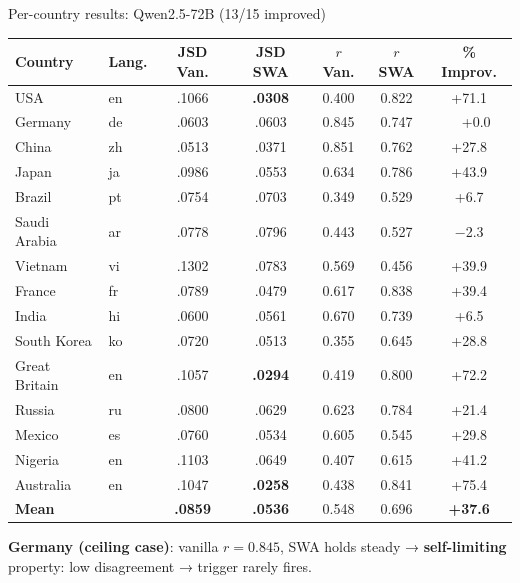 \documentclass[10pt,aspectratio=169]{beamer}
\newcommand{\gain}[1]{\textcolor{gaingreen}{#1}}
\newcommand{\loss}[1]{\textcolor{lossred}{#1}}
\begin{document}
\begin{frame}{Per-country results: Qwen2.5-72B (13/15 improved)}
  \centering\scriptsize
  \begin{tabular}{llccccc}
    \toprule
    Country & Lang. & JSD Van. & JSD SWA & $r$ Van. & $r$ SWA & \% Improv. \\
    \midrule
    USA          & en & .1066 & \textbf{.0308} & 0.400 & 0.822 & \gain{+71.1} \\
    Germany      & de & .0603 & .0603          & 0.845 & 0.747 & ~~+0.0 \\
    China        & zh & .0513 & .0371          & 0.851 & 0.762 & \gain{+27.8} \\
    Japan        & ja & .0986 & .0553          & 0.634 & 0.786 & \gain{+43.9} \\
    Brazil       & pt & .0754 & .0703          & 0.349 & 0.529 & \gain{+6.7}  \\
    Saudi Arabia & ar & .0778 & .0796          & 0.443 & 0.527 & \loss{$-$2.3}\\
    Vietnam      & vi & .1302 & .0783          & 0.569 & 0.456 & \gain{+39.9} \\
    France       & fr & .0789 & .0479          & 0.617 & 0.838 & \gain{+39.4} \\
    India        & hi & .0600 & .0561          & 0.670 & 0.739 & \gain{+6.5}  \\
    South Korea  & ko & .0720 & .0513          & 0.355 & 0.645 & \gain{+28.8} \\
    Great Britain& en & .1057 & \textbf{.0294} & 0.419 & 0.800 & \gain{+72.2} \\
    Russia       & ru & .0800 & .0629          & 0.623 & 0.784 & \gain{+21.4} \\
    Mexico       & es & .0760 & .0534          & 0.605 & 0.545 & \gain{+29.8} \\
    Nigeria      & en & .1103 & .0649          & 0.407 & 0.615 & \gain{+41.2} \\
    Australia    & en & .1047 & \textbf{.0258} & 0.438 & 0.841 & \gain{+75.4} \\
    \midrule
    \textbf{Mean}& & \textbf{.0859} & \textbf{.0536} & 0.548 & 0.696 & \gain{\textbf{+37.6}} \\
    \bottomrule
  \end{tabular}
  \vspace{0.3em}

  \footnotesize \textbf{Germany (ceiling case)}: vanilla $r=0.845$, SWA holds steady → \textbf{self-limiting} property: low disagreement → trigger rarely fires.
\end{frame}
\end{document}
